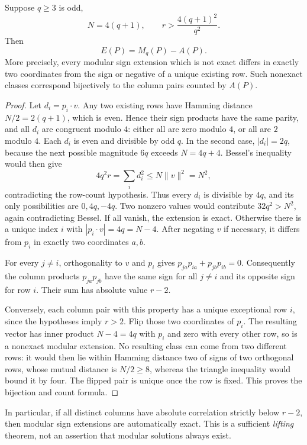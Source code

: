 \begin{theorem}
Suppose $q\ge3$ is odd,
\[
 N=4(q+1),\qquad r>\frac{4(q+1)^2}{q^2}.
\]
Then
\[
 \boxed{E(P)=M_q(P)-A(P).}
\]
More precisely, every modular sign extension which is not exact differs
in exactly two coordinates from the sign or negative of a unique
existing row. Such nonexact classes correspond bijectively to the
column pairs counted by $A(P)$.
\end{theorem}
\begin{proof}
Let $d_i=p_i\cdot v$. Any two existing rows have Hamming distance
$N/2=2(q+1)$, which is even. Hence their sign products have the same
parity, and all $d_i$ are congruent modulo $4$: either all are zero
modulo $4$, or all are $2$ modulo $4$.
Each $d_i$ is even and divisible by odd $q$. In the second case,
$|d_i|=2q$, because the next possible magnitude $6q$ exceeds
$N=4q+4$. Bessel's inequality would then give
\[
 4q^2r=\sum_i d_i^2\le N\|v\|^2=N^2,
\]
contradicting the row-count hypothesis.
Thus every $d_i$ is divisible by $4q$, and its only possibilities
are $0,4q,-4q$. Two nonzero values would contribute
$32q^2>N^2$, again contradicting Bessel. If all vanish, the extension
is exact. Otherwise there is a unique index $i$ with
$|p_i\cdot v|=4q=N-4$. After negating $v$ if necessary, it differs
from $p_i$ in exactly two coordinates $a,b$.

For every $j\ne i$, orthogonality to $v$ and $p_i$ gives
$p_{ja}p_{ia}+p_{jb}p_{ib}=0$. Consequently the column products
$p_{ja}p_{jb}$ have the same sign for all $j\ne i$ and its opposite
sign for row $i$. Their sum has absolute value $r-2$.

Conversely, each column pair with this property has a unique exceptional
row $i$, since the hypotheses imply $r>2$. Flip those two coordinates
of $p_i$. The resulting vector has inner product $N-4=4q$ with
$p_i$ and zero with every other row, so is a nonexact modular extension.
No resulting class can come from two different rows: it would then
lie within Hamming distance two of signs of two orthogonal rows,
whose mutual distance is $N/2\ge8$, whereas the triangle inequality
would bound it by four. The flipped pair is unique once the row is
fixed. This proves the bijection and count formula.
\end{proof}

In particular, if all distinct columns have absolute correlation
strictly below $r-2$, then modular sign extensions are automatically
exact. This is a sufficient \emph{lifting} theorem, not an assertion
that modular solutions always exist.

